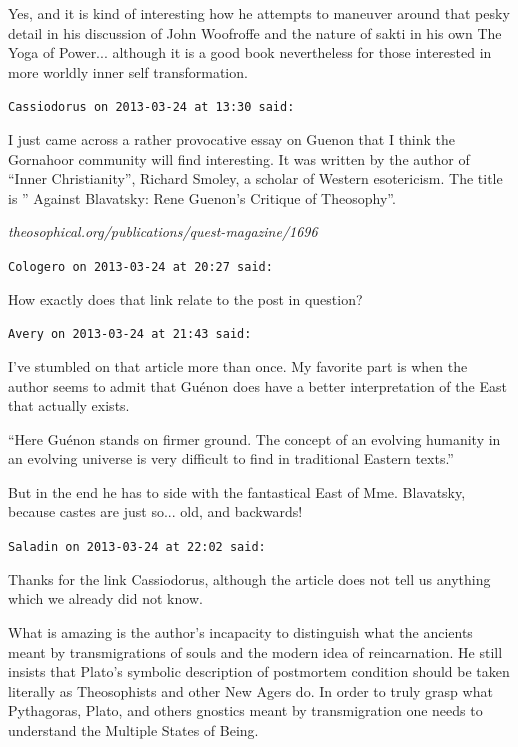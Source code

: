 \begin{footnotesize}
\begin{sffamily}
Yes, and it is kind of interesting how he attempts to maneuver around that pesky detail in his discussion of John Woofroffe and the nature of sakti in his own The Yoga of Power... although it is a good book nevertheless for those interested in more worldly inner self transformation.

\hfill

\texttt{Cassiodorus on 2013-03-24 at 13:30 said:}

I just came across a rather provocative essay on Guenon that I think the Gornahoor community will find interesting. It was written by the author of ``Inner Christianity'', Richard Smoley, a scholar of Western esotericism. The title is '' Against Blavatsky: Rene Guenon's Critique of Theosophy''.

\textit{theosophical.org/publications/quest-magazine/1696}


\hfill

\texttt{Cologero on 2013-03-24 at 20:27 said:}

How exactly does that link relate to the post in question?

\hfill

\texttt{Avery on 2013-03-24 at 21:43 said:}

I've stumbled on that article more than once. My favorite part is when the author seems to admit that Guénon does have a better interpretation of the East that actually exists.

``Here Guénon stands on firmer ground. The concept of an evolving humanity in an evolving universe is very difficult to find in traditional Eastern texts.''

But in the end he has to side with the fantastical East of Mme. Blavatsky, because castes are just so... old, and backwards!

\hfill

\texttt{Saladin on 2013-03-24 at 22:02 said:}

Thanks for the link Cassiodorus, although the article does not tell us anything which we already did not know.

What is amazing is the author's incapacity to distinguish what the ancients meant by transmigrations of souls and the modern idea of reincarnation. He still insists that Plato's symbolic description of postmortem condition should be taken literally as Theosophists and other New Agers do. In order to truly grasp what Pythagoras, Plato, and others gnostics meant by transmigration one needs to understand the Multiple States of Being.


\end{sffamily}
\end{footnotesize}
